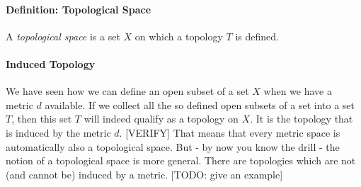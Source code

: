 



\paragraph{Definition: Topological Space} A \emph{topological space} is a set $X$ on which a topology $T$ is defined.


\paragraph{Induced Topology} 
We have seen how we can define an open subset of a set $X$ when we have a metric $d$ available. If we collect all the so defined open subsets of a set into a set $T$, then this set $T$ will indeed qualify as a topology on $X$. It is the topology that is induced by the metric $d$. [VERIFY] That means that every metric space is automatically also a topological space. But - by now you know the drill - the notion of a topological space is more general. There are topologies which are not (and cannot be) induced by a metric. [TODO: give an example]


